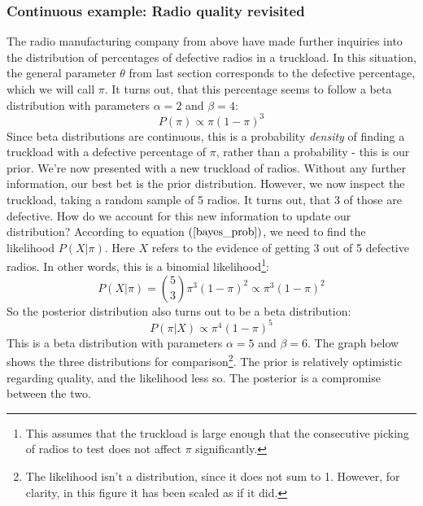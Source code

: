 \documentclass[12pt, a4paper]{article}
\begin{document}
\subsubsection{Continuous example: Radio quality revisited}
The radio manufacturing company from above have made further inquiries into the distribution of percentages of defective radios in a truckload. In this situation, the general parameter $\theta$ from last section corresponds to the defective percentage, which we will call $\pi$. It turns out, that this percentage seems to follow a beta distribution with parameters $\alpha=2$ and $\beta=4$:
\begin{equation}
P(\pi)\propto\pi(1-\pi)^3
\end{equation}
Since beta distributions are continuous, this is a probability \textit{density} of finding a truckload with a defective percentage of $\pi$, rather than a probability - this is our prior. We're now presented with a new truckload of radios. Without any further information, our best bet is the prior distribution. However, we now inspect the truckload, taking a random sample of 5 radios. It turns out, that 3 of those are defective. How do we account for this new information to update our distribution? According to equation $(\ref{bayes_prob})$, we need to find the likelihood $P(X|\pi)$. Here $X$ refers to the evidence of getting 3 out of 5 defective radios. In other words, this is a binomial likelihood\footnote{This assumes that the truckload is large enough that the consecutive picking of radios to test does not affect $\pi$ significantly.}:
\begin{equation}
P(X|\pi)=\binom{5}{3}\pi^3(1-\pi)^2\propto\pi^3(1-\pi)^2
\end{equation}
So the posterior distribution also turns out to be a beta distribution:
\begin{equation}
P(\pi|X)\propto\pi^4(1-\pi)^5
\end{equation}
This is a beta distribution with parameters $\alpha=5$ and $\beta=6$. The graph below shows the three distributions for comparison\footnote{The likelihood isn't a distribution, since it does not sum to 1. However, for clarity, in this figure it has been scaled as if it did.}. The prior is relatively optimistic regarding quality, and the likelihood less so. The posterior is a compromise between the two.

\end{document}
